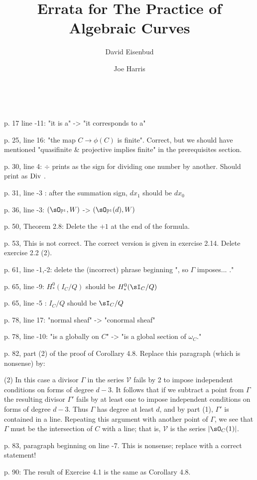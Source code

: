 \documentclass[twoside,12pt, leqno]{amsart}
\author[David Eisenbud]{David Eisenbud}
\author[Joe Harris ]{Joe Harris}
\title{Errata for The Practice of Algebraic Curves}
\def\PP{{\mathbb P}}
\begin{document}
\
\maketitle


\renewcommand{\thefootnote}{}%
%
p. 17 line -11: "it is a" -> "it corresponds to a"

p. 25, line 16: "the map $C \to \phi(C)$ is finite". Correct, but we should have mentioned "quasifinite \& projective implies finite" in the prerequisites section.

p. 30, line 4:  $\div$ prints as the sign for dividing one number by another. Should print as $\rm Div$ . 

p. 31, line -3 : after the summation sign, $dx_1$ should be $dx_0$

p. 36, line -3: $(\sO_{\PP^1}, W)$  -> $(\sO_{\PP^1}(d), W)$

p. 50, Theorem 2.8: Delete the $+1$ at the end of the formula.

p. 53, This is not correct. The correct version is given in exercise 2.14. Delete exercise 2.2 (2). 

p. 61, line -1,-2: delete the (incorrect) phrase beginning ", so $\Gamma$ imposes... ."

p. 65, line -9: $H^0_*(I_C/Q)$ should be $H^0_*(\sI_C/Q)$

p. 65, line -5 : $I_C/Q$ should be $\sI_C/Q$

p. 78, line 17: "normal sheaf" -> "conormal sheaf"

p. 78, line -10: "is a globally on $C$" -> "is a global section of $\omega_C$."

p. 82, part (2) of the proof of Corollary 4.8. Replace this paragraph (which is nonsense) by:

(2) In this case a divisor $\Gamma$ in the series $\mathcal V$ fails by 2 to impose independent conditions
on forms of degree $d-3$. It follows that if we subtract a point from $\Gamma$ the resulting divisor $\Gamma'$ fails
by at least one to impose independent conditions on forms of degree $d-3$. Thus $\Gamma$ has degree
at least $d$, and by part (1), $\Gamma'$ is contained in a line. Repeating this argument with another point of $\Gamma$,
we see that $\Gamma$ must be the intersection of $C$ with a line; that is, $\mathcal V$ is the series $|\sO_C(1)|$.

p. 83, paragraph beginning on line -7. This is nonsense; replace with a correct statement!

p. 90: The result of Exercise 4.1 is the same as Corollary 4.8.
\end{document}
